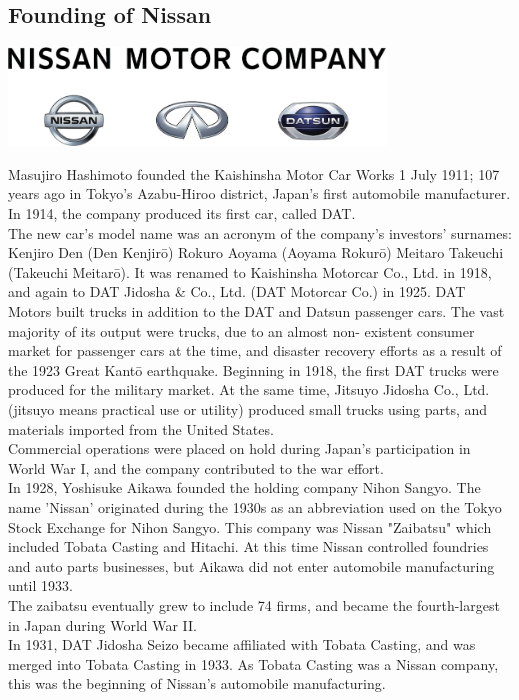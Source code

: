 \documentclass[11pt]{report}
\begin{document}
\subsection{Founding of Nissan}
\vspace{2mm}\begin{center}\includegraphics[width=10cm]{./img/nissanLogo.jpg}\end{center}
Masujiro Hashimoto founded the Kaishinsha Motor Car Works 1 July 1911; 107 years ago in Tokyo's Azabu-Hiroo district, Japan's first automobile manufacturer. In 1914, the company produced its first car, called DAT.\\ \indent The new car's model name was an acronym of the company's investors' surnames:\\
Kenjiro Den (Den Kenjirō) Rokuro Aoyama (Aoyama Rokurō) Meitaro Takeuchi (Takeuchi Meitarō).
It was renamed to Kaishinsha Motorcar Co., Ltd. in 1918, and again to DAT Jidosha \& Co., Ltd. (DAT Motorcar Co.) in 1925. DAT Motors built trucks in addition to the DAT and Datsun passenger cars. The vast majority of its output were trucks, due to an almost non- existent consumer market for passenger cars at the time, and disaster recovery efforts as a result of the 1923 Great Kantō earthquake. Beginning in 1918, the first DAT trucks were produced for the military market. At the same time, Jitsuyo Jidosha Co., Ltd. (jitsuyo means practical use or utility) produced small trucks using parts, and materials imported from the United States.\\ \indent Commercial operations were placed on hold during Japan's participation in World War I, and the company contributed to the war effort.\\ \indent In 1928, Yoshisuke Aikawa founded the holding company Nihon Sangyo. The name 'Nissan' originated during the 1930s as an abbreviation used on the Tokyo Stock Exchange for Nihon Sangyo. This company was Nissan "Zaibatsu" which included Tobata Casting and Hitachi. At this time Nissan controlled foundries and auto parts businesses, but Aikawa did not enter automobile manufacturing until 1933.\\
The zaibatsu eventually grew to include 74 firms, and became the fourth-largest in Japan during World War II.\\ In 1931, DAT Jidosha Seizo became affiliated with Tobata Casting, and was merged into Tobata Casting in 1933. As Tobata Casting was a Nissan company, this was the beginning of Nissan's automobile manufacturing.
\end{document}
